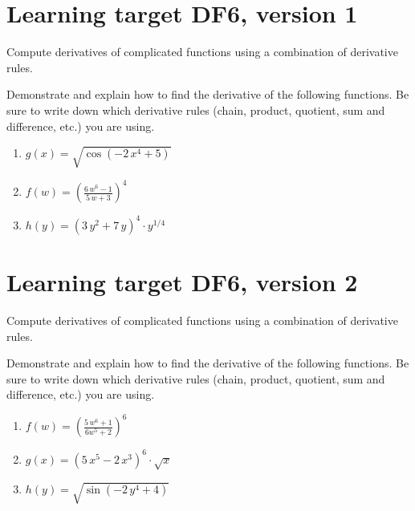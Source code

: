
\usepackage{pgfplots}

\everymath{\displaystyle}


\section{Learning target DF6, version 1}

Compute derivatives of complicated functions using a combination of derivative rules.

\hrulefill

Demonstrate and explain how to find the derivative of the following functions. Be sure to write down which derivative rules (chain, product, quotient, sum and difference, etc.) you are using.

\begin{enumerate}
    \item \(g(x) = \sqrt{\cos\left(-2 \, x^{4} + 5\right)}\)
    \vfill
    \item \(f(w) = \left( \frac{6 \, w^{6} - 1}{5 \, w + 3} \right)^{ 4 }\)
    \vfill
    \item \(h(y) = {\left(3 \, y^{2} + 7 \, y\right)}^{4}\cdot y^{1/4}\)
    \vfill
\end{enumerate}



\pagebreak

\section{Learning target DF6, version 2}

Compute derivatives of complicated functions using a combination of derivative rules.

\hrulefill

Demonstrate and explain how to find the derivative of the following functions. Be sure to write down which derivative rules (chain, product, quotient, sum and difference, etc.) you are using.

\begin{enumerate}
    \item \(f(w) = \left( \frac{5 \, w^{6} + 1}{6w^5 + 2} \right)^{ 6 }\)
    \vfill
    \item \(g(x) = {\left(5 \, x^{5} - 2 \, x^{3}\right)}^{6}\cdot  \sqrt{x}\)
    \vfill
    \item \(h(y) = \sqrt{\sin\left(-2 \, y^{4} + 4\right)}\)
    \vfill
\end{enumerate}


